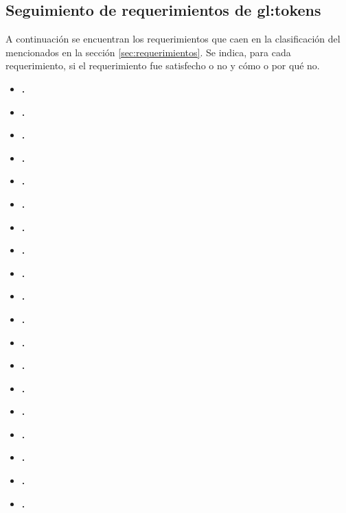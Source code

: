 %
%

\subsection{Seguimiento de requerimientos de \glspl{gl:token}}
\label{sec:seguimiento_token}

A continuación se encuentran los requerimientos que caen en la clasificación
del  mencionados en la sección
\ref{sec:requerimientos}. Se indica, para cada requerimiento, si el
requerimiento fue satisfecho o no y cómo o por qué no.

\begin{itemize}
  \item \textbf{.}
  \item \textbf{.}
  \item \textbf{.}
  \item \textbf{.}
  \item \textbf{.}
  \item \textbf{.}
  \item \textbf{.}
  \item \textbf{.}
  \item \textbf{.}
  \item \textbf{.}
  \item \textbf{.}
  \item \textbf{.}
  \item \textbf{.}
  \item \textbf{.}
  \item \textbf{.}
  \item \textbf{.}
  \item \textbf{.}
  \item \textbf{.}
  \item \textbf{.}

\end{itemize}
